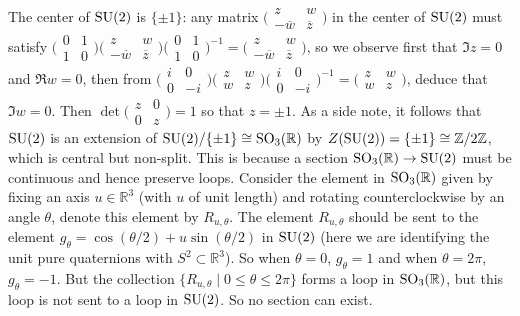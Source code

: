 \documentclass[../../rtnotes.tex]{subfiles}
\begin{document}
The center of $\operatorname{SU}(2)$ is $\{\pm 1\}$: any matrix $\bigl(\!\begin{smallmatrix}
	z & w \\ -\overline w & \overline z
\end{smallmatrix}\!\bigr)$ in the center of $\operatorname{SU}(2)$ must satisfy $\bigl(\!\begin{smallmatrix}
	0 & 1 \\ 1 & 0
\end{smallmatrix}\!\bigr)\bigl(\!\begin{smallmatrix}
	z & w \\ -\overline w & \overline z
\end{smallmatrix}\!\bigr)\bigl(\!\begin{smallmatrix}
	0 & 1 \\ 1 & 0
\end{smallmatrix}\!\bigr)^{-1} = \bigl(\!\begin{smallmatrix}
	z & w \\ -\overline w & \overline z
\end{smallmatrix}\!\bigr)$, so we observe first that $\Im z = 0$ and $\Re w  = 0$, then from $\bigl(\!\begin{smallmatrix}
	i & 0 \\ 0 & -i
\end{smallmatrix}\!\bigr)\bigl(\!\begin{smallmatrix}
	z & w \\ w & z
\end{smallmatrix}\!\bigr)\bigl(\!\begin{smallmatrix}
	i & 0 \\ 0 & -i
\end{smallmatrix}\!\bigr)^{-1} = \bigl(\!\begin{smallmatrix}
	z & w \\ w & z
\end{smallmatrix}\!\bigr)$, deduce that $\Im w = 0$. Then $\det \bigl(\!\begin{smallmatrix}
	z & 0 \\ 0 & z
\end{smallmatrix}\!\bigr) = 1$ so that $z = \pm 1$. As a side note, it follows that $\operatorname{SU}(2)$ is an extension of $\operatorname{SU}(2)/\{\pm 1\} \cong \operatorname{SO}_3(\mathbb R)$ by $Z(\operatorname{SU}(2)) = \{\pm 1\}\cong \mathbb Z/2\mathbb Z$, which is central but non-split. This is because a section $\operatorname{SO}_3(\mathbb R)\to \operatorname{SU}(2)$ must be continuous and hence preserve loops. Consider the element in $\operatorname{SO}_3(\mathbb R)$ given by fixing an axis $u\in\mathbb R^3$ (with $u$ of unit length) and rotating counterclockwise by an angle $\theta$, denote this element by $R_{u,\theta}$. The element $R_{u,\theta}$ should be sent to the element $g_\theta = \cos(\theta/2)+u\sin(\theta/2)$ in $\operatorname{SU}(2)$ (here we are identifying the unit pure quaternions with $S^2\subset \mathbb R^3$). So when $\theta = 0$, $g_\theta = 1$ and when $\theta = 2\pi$, $g_\theta = -1$. But the collection $\{R_{u,\theta}\mid 0\leq \theta\leq 2\pi\}$ forms a loop in $\operatorname{SO}_3(\mathbb R)$, but this loop is not sent to a loop in $\operatorname{SU}(2)$. So no section can exist.
\end{document}
